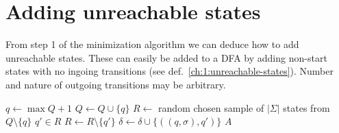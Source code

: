 %		
%		
%		
%		
%		
%		

\section{Adding unreachable states}

From step 1 of the minimization algorithm we can deduce how to add unreachable states. These can easily be added to a DFA by adding non-start states with no ingoing transitions (see def.~\ref{ch:1:unreachable-states}). Number and nature of outgoing transitions may be arbitrary.

\vspace{0.2cm}
\begin{algorithmic}[1]
		\State $q \gets \max Q + 1$
		\State $Q \gets Q \cup \{ q \}$
		\State $R \gets$ random chosen sample of $|\Sigma|$ states from $Q \setminus \{q\}$
			\State $q' \in R$
			\State $R \gets R \setminus \{q'\}$
			\State $\delta \gets \delta \cup \{ ((q, \sigma), q') \}$
		\EndFor
	\EndFor
	\State \Return $A$
	\EndFunction
\end{algorithmic}
\vspace{0.2cm}

